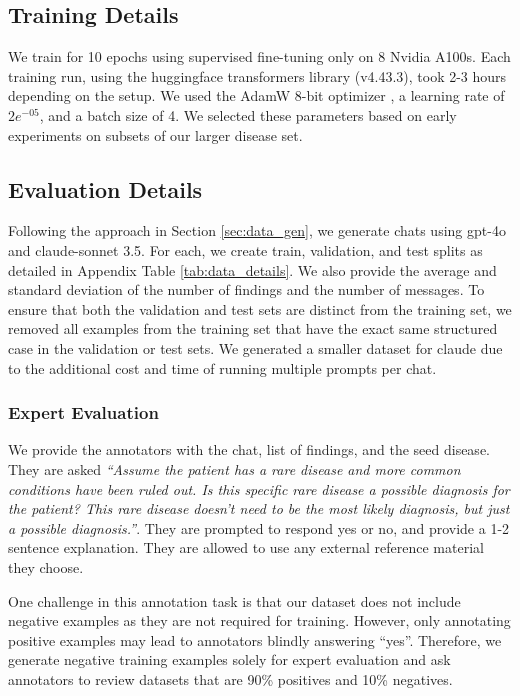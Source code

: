 \subsection{Training Details}\label{sec:training_details}
We train for 10 epochs using supervised fine-tuning only on 8 Nvidia A100s.  Each training run, using the huggingface transformers library (v4.43.3), took 2-3 hours depending on the setup. We used the AdamW 8-bit optimizer \cite{Loshchilov2017DecoupledWD}, a learning rate of $2e^{-05}$, and a batch size of 4. We selected these parameters based on early experiments on subsets of our larger disease set.

\subsection{Evaluation Details}
\label{sec:eval_app}
Following the approach in Section \ref{sec:data_gen}, we generate chats using gpt-4o and claude-sonnet 3.5.  For each, we create train, validation, and test splits as detailed in Appendix Table \ref{tab:data_details}.  We also provide the average and standard deviation of the number of findings and the number of messages.  To ensure that both the validation and test sets are distinct from the training set, we removed all examples from the training set that have the exact same structured case in the validation or test sets. We generated a smaller dataset for claude due to the additional cost and time of running multiple prompts per chat.

\subsubsection{Expert Evaluation}
\label{sec:eval_app_eval}

We provide the annotators with the chat, list of findings, and the seed disease.  They are asked
\textit{``Assume the patient has a rare disease and more common conditions have been ruled out. Is this specific rare disease a possible diagnosis for the patient? This rare disease doesn’t need to be the most likely diagnosis, but just a possible diagnosis.''}.  They are prompted to respond yes or no, and provide a 1-2 sentence explanation.  They are allowed to use any external reference material they choose.

One challenge in this annotation task is that our dataset does not include negative examples as they are not required for training.  However, only annotating positive examples may lead to annotators blindly answering ``yes''.  Therefore, we generate negative training examples solely for expert evaluation and ask annotators to review datasets that are 90\% positives and 10\% negatives.  

